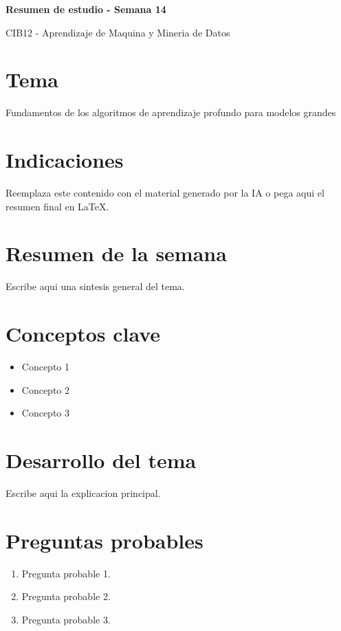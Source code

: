\documentclass[8pt,a4paper,twocolumn]{article}
\newcommand{\resumentitulo}{Resumen de estudio - Semana 14}
\begin{document}
\vspace*{-1.0em}
\begin{tcolorbox}[colback=black!12,colframe=black!35,boxrule=0.3pt,arc=1pt,left=4pt,right=4pt,top=3pt,bottom=3pt]
{\bfseries\normalsize \resumentitulo\par}
{\scriptsize CIB12 - Aprendizaje de Maquina y Mineria de Datos\par}
\end{tcolorbox}
\vspace{0.15em}

\section*{Tema}
Fundamentos de los algoritmos de aprendizaje profundo para modelos grandes

\section*{Indicaciones}
Reemplaza este contenido con el material generado por la IA o pega aqui el resumen final en LaTeX.

\section*{Resumen de la semana}
Escribe aqui una sintesis general del tema.

\section*{Conceptos clave}
\begin{itemize}
    \item Concepto 1
    \item Concepto 2
    \item Concepto 3
\end{itemize}

\section*{Desarrollo del tema}
Escribe aqui la explicacion principal.

\section*{Preguntas probables}
\begin{enumerate}
    \item Pregunta probable 1.
    \item Pregunta probable 2.
    \item Pregunta probable 3.
\end{enumerate}
\end{document}
